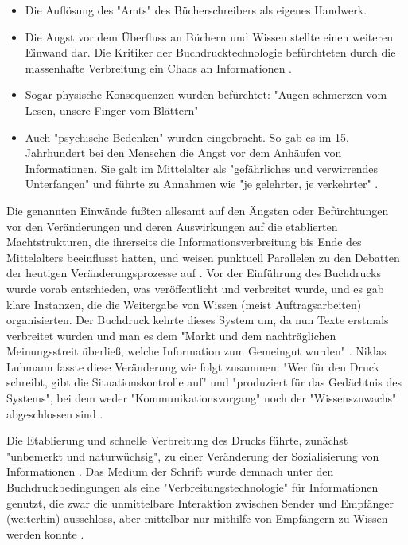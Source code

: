 \begin{itemize}
\item Die Auflösung des "Amts" des Bücherschreibers als eigenes Handwerk.
\item Die Angst vor dem Überfluss an Büchern und Wissen stellte einen weiteren Einwand dar. Die Kritiker der Buchdrucktechnologie befürchteten  durch die massenhafte Verbreitung ein Chaos an Informationen \cite{giesecke_1991_buchdruck}.
\item Sogar physische Konsequenzen wurden befürchtet: "Augen schmerzen vom Lesen, unsere Finger vom Blättern" \cite{giesecke_1991_buchdruck}
\item Auch "psychische Bedenken" wurden eingebracht. So gab es im 15. Jahrhundert bei den Menschen die Angst vor dem Anhäufen von Informationen. Sie galt im Mittelalter als "gefährliches und verwirrendes Unterfangen" und führte zu Annahmen wie "je gelehrter, je verkehrter" \cite{giesecke_1991_buchdruck}.
\end{itemize}

Die genannten Einwände fußten allesamt auf den Ängsten oder Befürchtungen vor den Veränderungen und deren Auswirkungen auf die etablierten Machtstrukturen, die ihrerseits die Informationsverbreitung bis Ende des Mittelalters beeinflusst hatten, und weisen punktuell Parallelen zu den Debatten der heutigen Veränderungsprozesse auf \cite{hagner_2015_sache_buches}. Vor der Einführung des Buchdrucks wurde vorab entschieden, was veröffentlicht und verbreitet wurde, und es gab klare Instanzen, die die Weitergabe von Wissen (meist Auftragsarbeiten) organisierten. Der Buchdruck kehrte dieses System um, da nun Texte erstmals verbreitet wurden und man es dem "Markt und dem nachträglichen Meinungsstreit überließ, welche Information zum Gemeingut wurden" \cite{giesecke_1991_buchdruck}. Niklas Luhmann fasste diese Veränderung wie folgt zusammen: "Wer für den Druck schreibt, gibt die Situationskontrolle auf" und "produziert für das Gedächtnis des Systems", bei dem weder "Kommunikationsvorgang" noch der "Wissenszuwachs" abgeschlossen sind \cite{Luhmann1998}.

Die Etablierung und schnelle Verbreitung \cite{stober_2014_pressegeschichte} des Drucks führte, zunächst "unbemerkt und naturwüchsig", zu einer Veränderung der Sozialisierung von Informationen \cite{giesecke_1991_buchdruck}. Das Medium der Schrift wurde demnach unter den Buchdruckbedingungen als eine "Verbreitungstechnologie" für Informationen genutzt, die zwar die unmittelbare Interaktion zwischen Sender und Empfänger (weiterhin) ausschloss, aber mittelbar nur mithilfe von Empfängern zu Wissen werden konnte \cite{Luhmann1998}.

